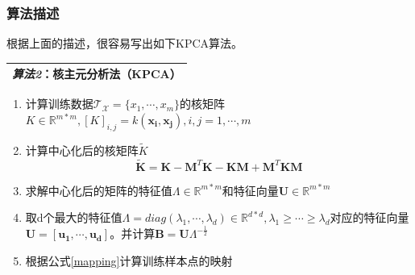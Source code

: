 \documentclass[10pt,a4paper]{article}
\begin{document}
\begin{CJK*}{UTF8}{song}
\subsubsection{算法描述}
根据上面的描述，很容易写出如下KPCA算法。
\begin{table}[!htp]
\label{notation}
\center
\begin{tabular}{|L{0.9\textwidth}|}
\hline
\textit{算法2}：核主元分析法（KPCA） \\
\hline
\end{tabular}
\end{table}
\begin{enumerate}
\item 计算训练数据$\mathcal{T_X}=\{x_1,\cdots,x_m\}$的核矩阵$K \in \mathbb{R}^{m*m},[K]_{i,j}=k(\boldsymbol{x_i},\boldsymbol{x_j}),i,j=1,\cdots,m$
\item 计算中心化后的核矩阵$\tilde{K}$
\begin{equation}
\tilde{\mathbf{K}}=\mathbf{K}-\mathbf{M}^T\mathbf{K}-\mathbf{K}\mathbf{M}
+\mathbf{M}^T\mathbf{K}\mathbf{M}
\end{equation}
\item 求解中心化后的矩阵的特征值$\Lambda \in \mathbb{R}^{m*m}$和特征向量$\mathbf{U} \in \mathbb{R}^{m*m}$
\item 取d个最大的特征值$\Lambda=diag(\lambda_1,\cdots,\lambda_d) \in \mathbb{R}^{d*d},\lambda_1\geqslant\cdots\geqslant\lambda_d$对应的特征向量$\mathbf{U}=[\boldsymbol{u_1},\cdots,\boldsymbol{u_d}]$。并计算$\mathbf{B}=\mathbf{U}\Lambda^{-\frac{1}{2}}$
\item 根据公式\ref{mapping}计算训练样本点的映射
\end{enumerate}



\end{CJK*}
\end{document}
